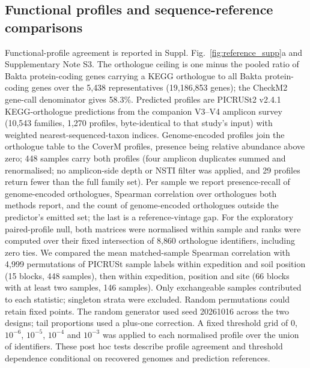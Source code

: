 \subsection*{Functional profiles and sequence-reference comparisons}
Functional-profile agreement is reported in Suppl. Fig.~\ref{fig:reference_supp}a and Supplementary Note S3. The orthologue ceiling is one minus the pooled ratio of Bakta protein-coding genes carrying a KEGG
orthologue to all Bakta protein-coding genes over the 5{,}438 representatives (19{,}186{,}853 genes);
the CheckM2 gene-call denominator gives 58.3\%. Predicted profiles are PICRUSt2 v2.4.1
\citep{douglas2020picrust2} KEGG-orthologue predictions from the companion V3--V4 amplicon survey
(10{,}543 families, 1{,}270 profiles, byte-identical to that study's input) with weighted
nearest-sequenced-taxon indices. Genome-encoded profiles join the orthologue table to the CoverM
profiles, presence being relative abundance above zero; 448 samples carry both profiles (four
amplicon duplicates summed and renormalised; no amplicon-side depth or NSTI filter was applied, and
29 profiles return fewer than the full family set). Per sample we report presence-recall of
genome-encoded orthologues, Spearman correlation over orthologues both methods report, and the count
of genome-encoded orthologues outside the predictor's emitted set; the last is a reference-vintage
gap.
For the exploratory paired-profile null, both matrices were normalised within sample and ranks were computed over their fixed intersection of 8{,}860 orthologue identifiers, including zero ties. We compared the mean matched-sample Spearman correlation with 4{,}999 permutations of PICRUSt sample labels within expedition and soil position (15 blocks, 448 samples), then within expedition, position and site (66 blocks with at least two samples, 146 samples). Only exchangeable samples contributed to each statistic; singleton strata were excluded. Random permutations could retain fixed points. The random generator used seed 20261016 across the two designs; tail proportions used a plus-one correction. A fixed threshold grid of $0$, $10^{-6}$, $10^{-5}$, $10^{-4}$ and $10^{-3}$ was applied to each normalised profile over the union of identifiers. These post hoc tests describe profile agreement and threshold dependence conditional on recovered genomes and prediction references.

